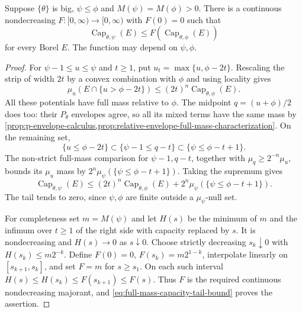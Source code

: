 \begin{lemma}\label{lem:full-mass-capacity-downward-comparison}
Suppose $\{\theta\}$ is big, $\psi\leq\phi$ and $M(\psi)=M(\phi)>0$. There is a continuous nondecreasing $F:[0,\infty)\to[0,\infty)$ with $F(0)=0$ such that
\[
 \operatorname{Cap}_{\theta,\psi}(E)
                      \leq F(\operatorname{Cap}_{\theta,\phi}(E))
\]
for every Borel $E$. The function may depend on $\psi,\phi$.
\end{lemma}
\begin{proof}
For $\psi-1\leq u\leq\psi$ and $t\geq1$, put $u_t=\max\{u,\phi-2t\}$. Rescaling the strip of width $2t$ by a convex combination with $\phi$ and using locality gives
\[
 \mu_u(E\cap\{u>\phi-2t\})
                       \leq(2t)^n\operatorname{Cap}_{\theta,\phi}(E).
\]
All these potentials have full mass relative to $\phi$. The midpoint $q=(u+\phi)/2$ does too: their $P_\theta$ envelopes agree, so all its mixed terms have the same mass by \cref{prop:p-envelope-calculus,prop:relative-envelope-full-mass-characterization}. On the remaining set,
\[
 \{u\leq\phi-2t\}\subset\{\psi-1\leq q-t\}
                         \subset\{\psi\leq\phi-t+1\}.
\]
The non-strict full-mass comparison for $\psi-1,q-t$, together with $\mu_q\geq2^{-n}\mu_u$, bounds its $\mu_u$ mass by
$2^n\mu_\psi(\{\psi\leq\phi-t+1\})$. Taking the supremum gives
\begin{equation}\label{eq:full-mass-capacity-tail-bound}
 \operatorname{Cap}_{\theta,\psi}(E)
 \leq(2t)^n\operatorname{Cap}_{\theta,\phi}(E)
                 +2^n\mu_\psi(\{\psi\leq\phi-t+1\}).
\end{equation}
The tail tends to zero, since $\psi,\phi$ are finite outside a $\mu_\psi$-null set.

For completeness set $m=M(\psi)$ and let $H(s)$ be the minimum of $m$ and the infimum over $t\geq1$ of the right side with capacity replaced by $s$. It is nondecreasing and $H(s)\to0$ as $s\downarrow0$. Choose strictly decreasing $s_k\downarrow0$ with $H(s_k)\leq m2^{-k}$. Define $F(0)=0$, $F(s_k)=m2^{1-k}$, interpolate linearly on $[s_{k+1},s_k]$, and set $F=m$ for $s\geq s_1$. On each such interval $H(s)\leq H(s_k)\leq F(s_{k+1})\leq F(s)$. Thus $F$ is the required continuous nondecreasing majorant, and \eqref{eq:full-mass-capacity-tail-bound} proves the assertion.
\end{proof}

